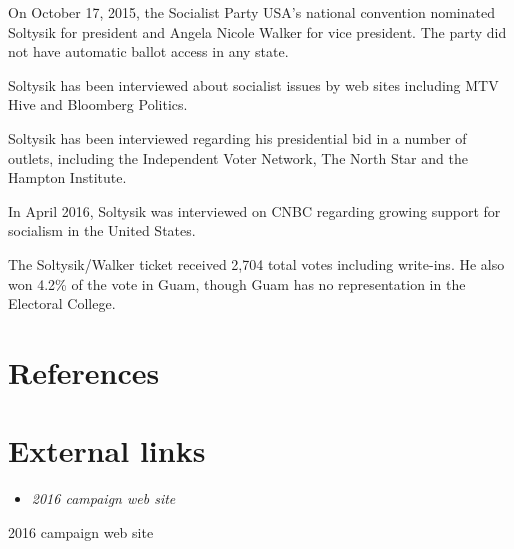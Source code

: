 On October 17, 2015, the Socialist Party USA's national convention
nominated Soltysik for president and Angela Nicole Walker for vice
president. The party did not have automatic ballot access in any state.

Soltysik has been interviewed about socialist issues by web sites
including MTV Hive and Bloomberg Politics.

Soltysik has been interviewed regarding his presidential bid in a number
of outlets, including the Independent Voter Network, The North Star and
the Hampton Institute.

In April 2016, Soltysik was interviewed on CNBC regarding growing
support for socialism in the United States.

The Soltysik/Walker ticket received 2,704 total votes including
write-ins. He also won 4.2\% of the vote in Guam, though Guam has no
representation in the Electoral College.

\section{References}\label{references}

\section{External links}\label{external-links}

\begin{itemize}
\item
  \emph{2016 campaign web site}
\end{itemize}

2016 campaign web site
